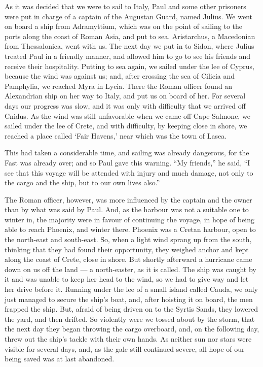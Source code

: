  As it was decided that we were to sail to Italy, Paul and
some other prisoners were put in charge of a captain of the Augustan
Guard, named Julius.  We went on board a ship from
Adramyttium, which was on the point of sailing to the ports along the
coast of Roman Asia, and put to sea. Aristarchus, a Macedonian from
Thessalonica, went with us.  The next day we put in to
Sidon, where Julius treated Paul in a friendly manner, and allowed him
to go to see his friends and receive their hospitality. 
Putting to sea again, we sailed under the lee of Cyprus, because the
wind was against us;  and, after crossing the sea of Cilicia
and Pamphylia, we reached Myra in Lycia.  There the Roman
officer found an Alexandrian ship on her way to Italy, and put us on
board of her.  For several days our progress was slow, and
it was only with difficulty that we arrived off Cnidus. As the wind was
still unfavorable when we came off Cape Salmone, we sailed under the lee
of Crete,  and with difficulty, by keeping close in shore,
we reached a place called `Fair Havens,' near which was the town of
Lasea.

 This had taken a considerable time, and sailing was already
dangerous, for the Fast was already over; and so Paul gave this warning.
 ``My friends,'' he said, ``I see that this voyage will be
attended with injury and much damage, not only to the cargo and the
ship, but to our own lives also.''

 The Roman officer, however, was more influenced by the
captain and the owner than by what was said by Paul.  And,
as the harbour was not a suitable one to winter in, the majority were in
favour of continuing the voyage, in hope of being able to reach Phoenix,
and winter there. Phoenix was a Cretan harbour, open to the north-east
and south-east.  So, when a light wind sprang up from the
south, thinking that they had found their opportunity, they weighed
anchor and kept along the coast of Crete, close in shore. 
But shortly afterward a hurricane came down on us off the land --- a
north-easter, as it is called.  The ship was caught by it
and was unable to keep her head to the wind, so we had to give way and
let her drive before it.  Running under the lee of a small
island called Cauda, we only just managed to secure the ship's boat,
 and, after hoisting it on board, the men frapped the ship.
But, afraid of being driven on to the Syrtis Sands, they lowered the
yard, and then drifted.  So violently were we tossed about
by the storm, that the next day they began throwing the cargo overboard,
 and, on the following day, threw out the ship's tackle
with their own hands.  As neither sun nor stars were
visible for several days, and, as the gale still continued severe, all
hope of our being saved was at last abandoned.


